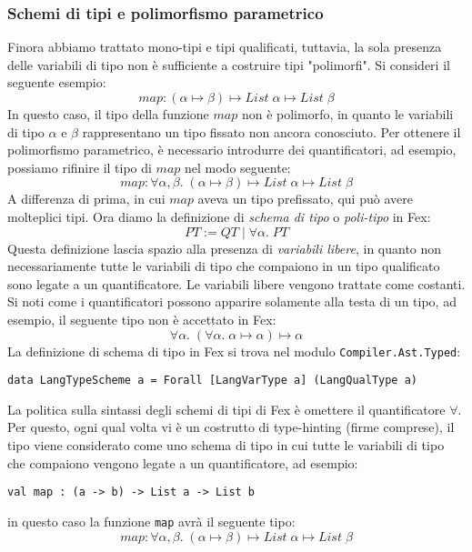 \documentclass[10pt,a4paper]{article}
\begin{document}
\subsubsection{Schemi di tipi e polimorfismo parametrico}
Finora abbiamo trattato mono-tipi e tipi qualificati, tuttavia, la sola presenza delle variabili di tipo non è sufficiente
a costruire tipi "polimorfi". Si consideri il seguente esempio:
\[ map : (\alpha \mapsto \beta) \mapsto List \; \alpha \mapsto List \; \beta \]
In questo caso, il tipo della funzione $ map $ non è polimorfo, in quanto le variabili di tipo $ \alpha $ e $ \beta $
rappresentano un tipo fissato non ancora conosciuto. Per ottenere il polimorfismo parametrico, è necessario introdurre
dei quantificatori, ad esempio, possiamo rifinire il tipo di $ map $ nel modo seguente:
\[ map : \forall \alpha, \beta . \; (\alpha \mapsto \beta) \mapsto List \; \alpha \mapsto List \; \beta \]
A differenza di prima, in cui $ map $ aveva un tipo prefissato, qui può avere molteplici tipi. Ora diamo la definizione
di \textit{schema di tipo} o \textit{poli-tipo} in Fex:
\[ PT := QT \; | \; \forall \alpha. \; PT \]
Questa definizione lascia spazio alla presenza di \textit{variabili libere}, in quanto non necessariamente tutte le
variabili di tipo che compaiono in un tipo qualificato sono legate a un quantificatore. Le variabili libere vengono
trattate come costanti. Si noti come i quantificatori possono apparire solamente alla testa di un tipo, ad esempio, il
seguente tipo non è accettato in Fex:
\[ \forall \alpha . \; (\forall \alpha . \; \alpha \mapsto \alpha) \mapsto \alpha \]
La definizione di schema di tipo in Fex si trova nel modulo \texttt{Compiler.Ast.Typed}:
\begin{lstlisting}
data LangTypeScheme a = Forall [LangVarType a] (LangQualType a)
\end{lstlisting}
La politica sulla sintassi degli schemi di tipi di Fex è omettere il quantificatore $ \forall $. Per questo, ogni qual
volta vi è un costrutto di type-hinting (firme comprese), il tipo viene considerato come uno schema di tipo in cui tutte
le variabili di tipo che compaiono vengono legate a un quantificatore, ad esempio:
\begin{lstlisting}
val map : (a -> b) -> List a -> List b
\end{lstlisting}
in questo caso la funzione \texttt{map} avrà il seguente tipo:
\[ map : \forall \alpha, \beta . \; (\alpha \mapsto \beta) \mapsto List \; \alpha \mapsto List \; \beta \]
\end{document}
